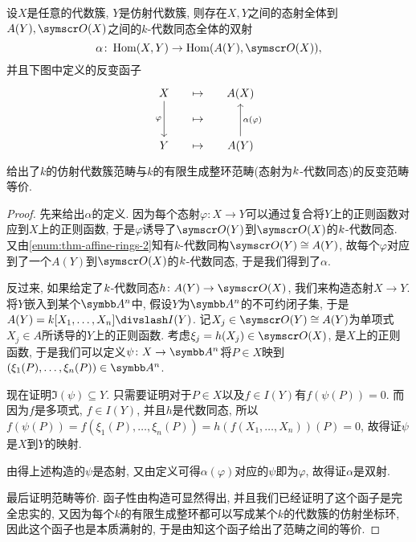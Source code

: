\begin{theorem}\label{thm:categoryisoaffinevariety}
  设$X$是任意的代数簇, $Y$是仿射代数簇, 则存在$X, Y$之间的态射全体到$A(Y), \OO (X)$之间的$k$-代数同态全体的双射
  \begin{equation*}
    \alpha\colon \Hom (X, Y)\to\Hom (A(Y), \OO (X)),
  \end{equation*}
  并且下图中定义的反变函子
  \begin{equation*}
    \begin{tikzcd}[sep=small]
      X \arrow[dd, "\varphi"'] & \mapsto & A(X)\\
      & \mapsto & \\
      Y & \mapsto & A(Y) \arrow[uu, "\alpha (\varphi)"']
    \end{tikzcd}
  \end{equation*}
  给出了$k$的仿射代数簇范畴与$k$的有限生成整环范畴(态射为$k$-代数同态)的反变范畴等价.
\end{theorem}

\begin{proof}
  先来给出$\alpha$的定义. 因为每个态射$\varphi\colon X\to Y$可以通过复合将$Y$上的正则函数对应到$X$上的正则函数, 于是$\varphi$诱导了$\OO (Y)$到$\OO (X)$的$k$-代数同态. 又由\ref{enum:thm-affine-rings-2}知有$k$-代数同构$\OO (Y)\cong A(Y)$, 故每个$\varphi$对应到了一个$A(Y)$到$\OO (X)$的$k$-代数同态, 于是我们得到了$\alpha$.

  反过来, 如果给定了$k$-代数同态$h\colon A(Y)\to \OO (X)$, 我们来构造态射$X\to Y$. 将$Y$嵌入到某个$\AF^n$中, 假设$Y$为$\AF^n$的不可约闭子集, 于是$A(Y)=\kk [X_1, \dotsc, X_n]{\divslash} I(Y)$. 记$X_j\in \OO (Y)\cong A(Y)$为单项式$X_j\in A$所诱导的$Y$上的正则函数. 考虑$\xi_j=h(X_j)\in \OO (X)$, 是$X$上的正则函数, 于是我们可以定义$\psi\colon X\to \AF^n$将$P\in X$映到$(\xi_1 (P), \dotsc, \xi_n (P))\in \AF^n$.

  现在证明$\Im (\psi)\subseteq Y$. 只需要证明对于$P\in X$以及$f\in I(Y)$有$f(\psi(P))=0$. 而因为$f$是多项式, $f\in I(Y)$, 并且$h$是代数同态, 所以$f(\psi(P))=f(\xi_1(P), \dotsc, \xi_n(P))=h(f(X_1, \dotsc, X_n))(P)=0$, 故得证$\psi$是$X$到$Y$的映射.

  由得上述构造的$\psi$是态射, 又由定义可得$\alpha(\varphi)$对应的$\psi$即为$\varphi$, 故得证$\alpha$是双射.

  最后证明范畴等价. 函子性由构造可显然得出, 并且我们已经证明了这个函子是完全忠实的, 又因为每个$k$的有限生成整环都可以写成某个$k$的代数簇的仿射坐标环, 因此这个函子也是本质满射的, 于是由知这个函子给出了范畴之间的等价.
\end{proof}

